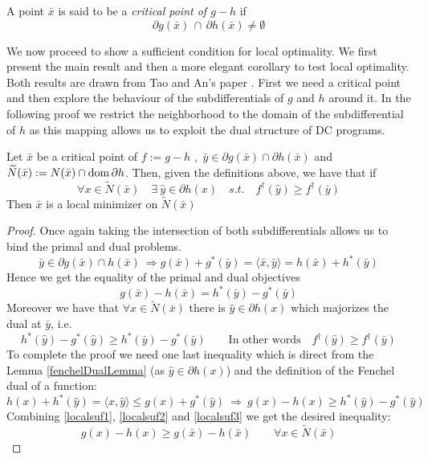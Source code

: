 \begin{definition}
	A point $\bar x$ is said to be a \emph{critical point of $g-h$} if
	\[\partial g(\bar x) \, \cap \, \partial h(\bar x) \neq \emptyset \]
\end{definition}
We now proceed to show a sufficient condition for local optimality.
We first present the main result and then a more elegant corollary
to test local optimality. Both results are drawn from  Tao and An's paper
\autocite{tao1997convex}.
First we need a critical point and then explore the behaviour of 
the subdifferentials of $g$ and $h$ around it. In the following proof we
restrict the neighborhood to the domain of the subdifferential of $h$ as this
mapping allows us to exploit the dual structure of DC programs.

%
\begin{theorem}
%
Let $\bar x$ be a critical point of $f:=g-h$ , 
$\, \bar y \in \partial g(\bar x) \cap \partial h(\bar x)$ and 
$\widetilde{N}(\bar x):= N(\bar x) \cap \mathrm{dom} \,
\partial h$. Then, given the definitions above, we have that if 
\begin{equation}
	\forall x \in \widetilde{N}(\bar x) \quad \exists \
	\hat y \in \partial h(x)  \quad s.t.\quad
	f^\dagger(\hat y)\geq f^\dagger(\bar y)
\end{equation}
Then  $\bar x$ is a local minimizer on $\widetilde N(\bar x)$
\begin{proof}
Once again taking the intersection of both subdifferentials
allows us to bind the primal and dual problems. 
\begin{equation*}
	\bar y \in \partial g(\bar x) \cap h(\bar x) \ \Rightarrow 
	g(\bar x)+g^*(\bar y)=\langle \bar x,\bar y\rangle = 
	h(\bar x) + h^*(\bar y)
\end{equation*}
Hence  we get the equality of the primal and dual objectives
\begin{equation}
	g(\bar x) - h(\bar x) = h^*(\bar y) - g^*(\bar y)
	\label{localsuf1}
\end{equation}
Moreover we have that $\forall x \in \widetilde{N}(\bar x)$ there is 
$\hat y\in \partial h(x)$ which majorizes the dual at $\bar y$, i.e.
\begin{equation}
	h^*(\hat y) - g^*(\hat y) \geq h^*(\bar y) - g^*(\bar y) \qquad
	\text{In other words} \quad f^\dagger (\hat y) \geq f^\dagger(\bar y)
	\label{localsuf2}
\end{equation}
To complete the proof we need one last inequality which is direct
from the Lemma \ref{fenchelDualLemma} (as $\hat y \in \partial h(x)$)
and the definition of the Fenchel dual of a function:
\begin{equation}
	h(x)+h^*(\hat y) = \langle x,\hat y\rangle \leq g(x)+g^*(\hat y)
	\ \Rightarrow \ g(x)-h(x)\geq h^*(\hat y) -g^*(\hat y)
	\label{localsuf3}
\end{equation}
Combining \eqref{localsuf1}, \eqref{localsuf2} and \eqref{localsuf3}
we get the desired inequality:
\begin{equation*}
	g(x) - h(x) \geq g(\bar x)-h(\bar x) \qquad \forall x \in 
	\widetilde N(\bar x) 
\end{equation*}
\end{proof}
\end{theorem}
